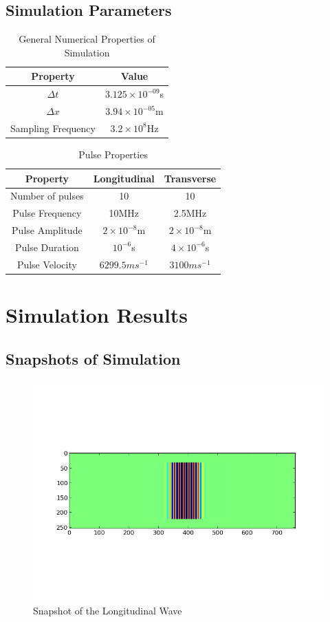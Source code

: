\subsection{Simulation Parameters}
\begin{table}[ht]
\caption{General Numerical Properties of Simulation}
\begin{tabular}{|c|c|}
\hline
\textbf{Property} & \textbf{Value} \\ \hline
$\Delta t$ & $3.125 \times 10^{-09}$s \\ \hline
$\Delta x$ & $3.94 \times 10^{-05}$m \\ \hline
Sampling Frequency & $3.2 \times 10^{8}$Hz \\ \hline
\end{tabular}
\end{table}
\begin{table}[ht]
\caption{Pulse Properties}
\begin{tabular}{|c|c|c|}
\hline
\textbf{Property} & \textbf{Longitudinal} & \textbf{Transverse} \\ \hline
Number of pulses & 10 & 10 \\ \hline
Pulse Frequency & 10MHz & 2.5MHz \\ \hline
Pulse Amplitude & $2 \times 10^{-8}$m & $2 \times 10^{-8}$m \\ \hline
Pulse Duration & $10^{-6}$s & $4 \times 10^{-6}$s \\ \hline
Pulse Velocity & $6299.5ms^{-1}$ & $3100ms^{-1}$\\ \hline 
\end{tabular}
\end{table}
\section{Simulation Results}
\subsection{Snapshots of Simulation}
\begin{figure}[ht]
\centering
\includegraphics[scale=0.5]{images/chapter_3/simulation_picture_long.png}
\caption{Snapshot of the Longitudinal Wave}
\end{figure}

